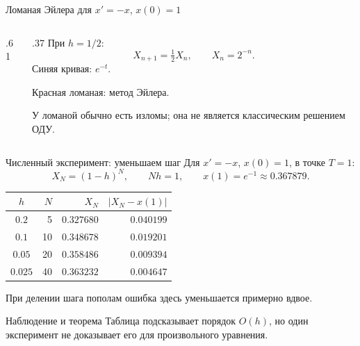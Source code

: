 \documentclass[aspectratio=169,11pt]{beamer}
\begin{document}
\begin{frame}{Ломаная Эйлера для $x'=-x$, $x(0)=1$}
\begin{columns}[c]
\begin{column}{.61\textwidth}
\centering
{}
\end{column}
\begin{column}{.37\textwidth}
При $h=1/2$:
\[
X_{n+1}=\tfrac12X_n,\qquad X_n=2^{-n}.
\]
Синяя кривая: $e^{-t}$.

Красная ломаная: метод Эйлера.
\medskip

У ломаной обычно есть изломы; она не является классическим решением ОДУ.
\end{column}
\end{columns}
\end{frame}

\begin{frame}{Численный эксперимент: уменьшаем шаг}
Для $x'=-x$, $x(0)=1$, в точке $T=1$:
\[
X_N=(1-h)^N,\qquad Nh=1,\qquad x(1)=e^{-1}\approx0.367879.
\]
\begin{center}
\renewcommand{\arraystretch}{1.25}
\begin{tabular}{c r r r}
$h$ & $N$ & $X_N$ & $|X_N-x(1)|$\\ \hline
$0.2$ & 5 & $0.327680$ & $0.040199$\\
$0.1$ & 10 & $0.348678$ & $0.019201$\\
$0.05$ & 20 & $0.358486$ & $0.009394$\\
$0.025$ & 40 & $0.363232$ & $0.004647$
\end{tabular}
\end{center}
При делении шага пополам ошибка здесь уменьшается примерно вдвое.
\begin{block}{Наблюдение и теорема}
Таблица подсказывает порядок $O(h)$, но один эксперимент не доказывает его
для произвольного уравнения.
\end{block}
\end{frame}
\end{document}
